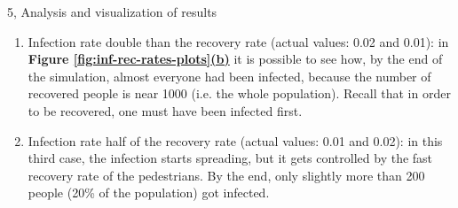 \documentclass[10pt,a4paper]{article}
\begin{document}
\begin{task}{5, Analysis and visualization of results}
\begin{enumerate}
    \item Infection rate double than the recovery rate (actual values: 0.02 and 0.01):
    in \textbf{Figure \hyperref[fig:inf-rec-rate-plots]{\ref{fig:inf-rec-rates-plots}(b)}} it is possible to see how, by the end of the simulation, almost everyone had been infected, because the number of recovered people is near 1000 (i.e. the whole population).
    Recall that in order to be recovered, one must have been infected first.
    
    \item Infection rate half of the recovery rate (actual values: 0.01 and 0.02):
    in this third case, the infection starts spreading, but it gets controlled by the fast recovery rate of the pedestrians.
    By the end, only slightly more than 200 people (20\% of the population) got infected.
\end{enumerate}


\end{task}
\end{document}
